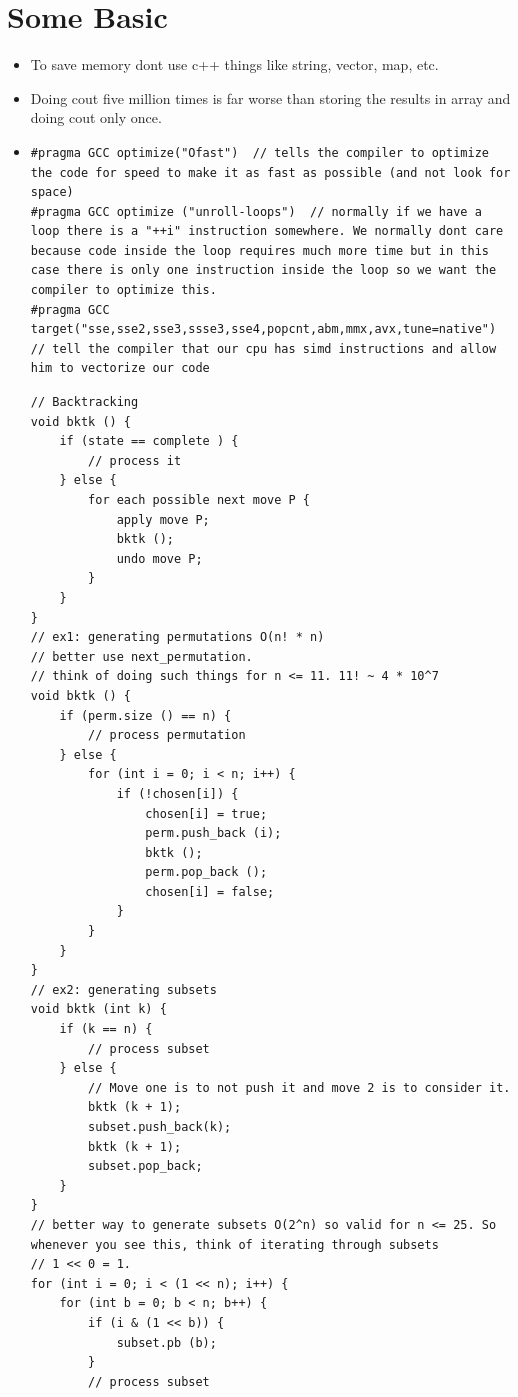 \documentclass[8pt, a4paper, oneside, twocolumn]{extarticle}
\begin{document}
\section{Some Basic}
\begin{itemize}
    \item To save memory dont use c++ things like string, vector, map, etc.
    \item Doing cout five million times is far worse than storing the results in array and doing cout only once.
    \item 
\begin{verbatim}
#pragma GCC optimize("Ofast")  // tells the compiler to optimize the code for speed to make it as fast as possible (and not look for space)
#pragma GCC optimize ("unroll-loops")  // normally if we have a loop there is a "++i" instruction somewhere. We normally dont care because code inside the loop requires much more time but in this case there is only one instruction inside the loop so we want the compiler to optimize this.
#pragma GCC target("sse,sse2,sse3,ssse3,sse4,popcnt,abm,mmx,avx,tune=native")  // tell the compiler that our cpu has simd instructions and allow him to vectorize our code
\end{verbatim}
\begin{verbatim}
// Backtracking
void bktk () {
    if (state == complete ) {
        // process it
    } else {
        for each possible next move P {
            apply move P;
            bktk ();
            undo move P;
        }
    }
}
// ex1: generating permutations O(n! * n)
// better use next_permutation. 
// think of doing such things for n <= 11. 11! ~ 4 * 10^7
void bktk () {
    if (perm.size () == n) {
        // process permutation 
    } else {
        for (int i = 0; i < n; i++) {
            if (!chosen[i]) {
                chosen[i] = true;
                perm.push_back (i);
                bktk ();
                perm.pop_back ();
                chosen[i] = false;
            }
        }
    }
}
// ex2: generating subsets
void bktk (int k) {
    if (k == n) {
        // process subset
    } else {
        // Move one is to not push it and move 2 is to consider it.
        bktk (k + 1);
        subset.push_back(k);
        bktk (k + 1);
        subset.pop_back;
    }
}
// better way to generate subsets O(2^n) so valid for n <= 25. So whenever you see this, think of iterating through subsets
// 1 << 0 = 1.
for (int i = 0; i < (1 << n); i++) {
    for (int b = 0; b < n; b++) {
        if (i & (1 << b)) {
            subset.pb (b);
        }
        // process subset

\end{verbatim}
\end{itemize}
\end{document}
